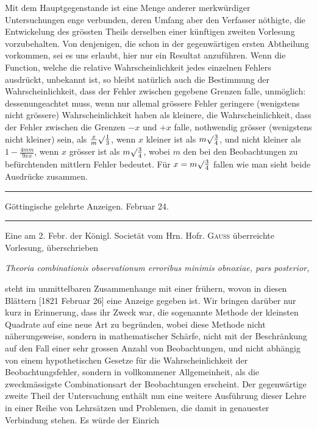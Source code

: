 Mit dem Hauptgegenstande ist eine Menge anderer merkwürdiger Unter\-suchungen enge verbunden, deren Umfang aber den Verfasser nöthigte, die Entwickelung des grössten Theils derselben einer künftigen zweiten Vorlesung vorzubehalten. Von denjenigen, die schon in der gegenwärtigen ersten Abtheilung vorkommen, sei es uns erlaubt, hier nur ein Resultat anzuführen. Wenn die Function, welche die relative Wahrscheinlichkeit jedes einzelnen Fehlers ausdrückt, unbekannt ist, so bleibt natürlich auch die Bestimmung der Wahrscheinlichkeit, dass der Fehler zwischen gegebene Grenzen falle, unmöglich: dessenungeachtet muss, wenn nur allemal grössere Fehler geringere (wenigstens nicht grössere) Wahrscheinlichkeit haben als kleinere, die Wahrscheinlichkeit, dass der Fehler zwischen die Grenzen \(-x\) und \(+x\) falle, nothwendig grösser (wenigstens nicht kleiner) sein, als \(\frac{x}{m}\surd\frac13\), wenn \(x\) kleiner ist als \(m\surd\frac34\), und nicht kleiner als \(1-\frac{4mm}{9xx}\), wenn \(x\) grösser ist als \(m\surd\frac34\), wobei \(m\) den bei den Beobachtungen zu befürchtenden mittlern Fehler bedeutet. Für \(x=m\surd\frac34\) fallen wie man sieht beide Ausdrücke zusammen.

\par\bigskip
\begin{center}
\rule{.88\textwidth}{.3pt}\par
Göttingische gelehrte Anzeigen. Februar 24.\par
\rule{.88\textwidth}{.3pt}
\end{center}

Eine am 2. Febr. der Königl. Societät vom Hrn. Hofr. \textsc{Gauss} überreichte Vorlesung, überschrieben
\begin{center}
\textit{Theoria combinationis observationum erroribus minimis obnoxiae, pars posterior,}
\end{center}
\noindent steht im unmittelbaren Zusammenhange mit einer frühern, wovon in diesen Blättern [1821 Februar 26] eine Anzeige gegeben ist. Wir bringen darüber nur kurz in Erinnerung, dass ihr Zweck war, die sogenannte Methode der kleinsten Quadrate auf eine neue Art zu begründen, wobei diese Methode nicht näherungsweise, sondern in mathematischer Schärfe, nicht mit der Beschränkung auf den Fall einer sehr grossen Anzahl von Beobachtungen, und nicht abhängig von einem hypothetischen Gesetze für die Wahrscheinlichkeit der Beobachtungsfehler, sondern in vollkommener Allgemeinheit, als die zweckmässigste Combinationsart der Beobachtungen erscheint. Der gegenwärtige zweite Theil der Untersuchung enthält nun eine weitere Ausführung dieser Lehre in einer Reihe von Lehrsätzen und Problemen, die damit in genauester Verbindung stehen. Es würde der Einrich%
